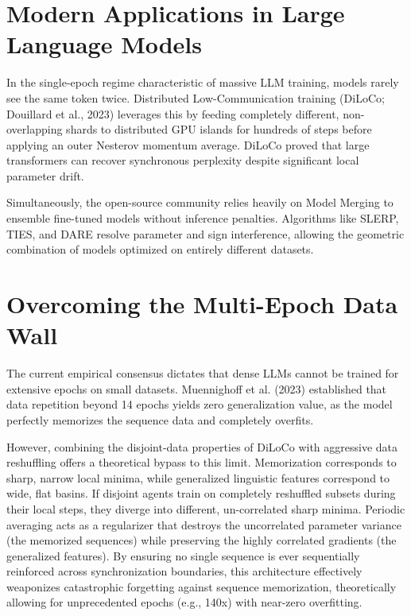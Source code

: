 \documentclass[11pt]{article}
\begin{document}
\section{Modern Applications in Large Language Models}
In the single-epoch regime characteristic of massive LLM training, models rarely see the same token twice. Distributed Low-Communication training (DiLoCo; Douillard et al., 2023) leverages this by feeding completely different, non-overlapping shards to distributed GPU islands for hundreds of steps before applying an outer Nesterov momentum average. DiLoCo proved that large transformers can recover synchronous perplexity despite significant local parameter drift.

Simultaneously, the open-source community relies heavily on Model Merging to ensemble fine-tuned models without inference penalties. Algorithms like SLERP, TIES, and DARE resolve parameter and sign interference, allowing the geometric combination of models optimized on entirely different datasets.

\section{Overcoming the Multi-Epoch Data Wall}
The current empirical consensus dictates that dense LLMs cannot be trained for extensive epochs on small datasets. Muennighoff et al. (2023) established that data repetition beyond 14 epochs yields zero generalization value, as the model perfectly memorizes the sequence data and completely overfits. 

However, combining the disjoint-data properties of DiLoCo with aggressive data reshuffling offers a theoretical bypass to this limit. Memorization corresponds to sharp, narrow local minima, while generalized linguistic features correspond to wide, flat basins. If disjoint agents train on completely reshuffled subsets during their local steps, they diverge into different, un-correlated sharp minima. Periodic averaging acts as a regularizer that destroys the uncorrelated parameter variance (the memorized sequences) while preserving the highly correlated gradients (the generalized features). By ensuring no single sequence is ever sequentially reinforced across synchronization boundaries, this architecture effectively weaponizes catastrophic forgetting against sequence memorization, theoretically allowing for unprecedented epochs (e.g., 140x) with near-zero overfitting.
\end{document}
